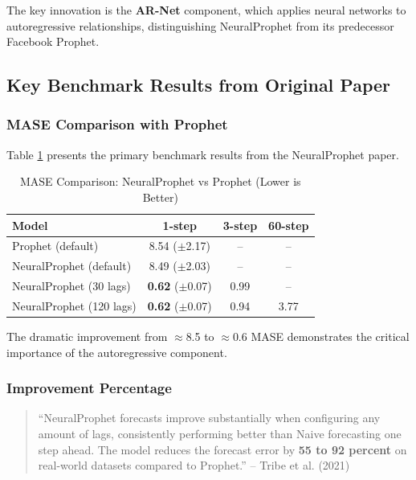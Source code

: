 \documentclass[12pt,a4paper]{article}
\begin{document}
The key innovation is the \textbf{AR-Net} component, which applies neural networks to autoregressive relationships, distinguishing NeuralProphet from its predecessor Facebook Prophet.

\subsection{Key Benchmark Results from Original Paper}

\subsubsection{MASE Comparison with Prophet}

Table \ref{tab:np_mase} presents the primary benchmark results from the NeuralProphet paper.

\begin{table}[htbp]
\centering
\caption{MASE Comparison: NeuralProphet vs Prophet (Lower is Better)}
\label{tab:np_mase}
\begin{tabular}{|l|c|c|c|}
\hline
\textbf{Model} & \textbf{1-step} & \textbf{3-step} & \textbf{60-step} \\
\hline
Prophet (default) & 8.54 ($\pm$2.17) & -- & -- \\
NeuralProphet (default) & 8.49 ($\pm$2.03) & -- & -- \\
NeuralProphet (30 lags) & \textbf{0.62} ($\pm$0.07) & 0.99 & -- \\
NeuralProphet (120 lags) & \textbf{0.62} ($\pm$0.07) & 0.94 & 3.77 \\
\hline
\end{tabular}
\end{table}

The dramatic improvement from $\approx$8.5 to $\approx$0.6 MASE demonstrates the critical importance of the autoregressive component.

\subsubsection{Improvement Percentage}

\begin{quote}
``NeuralProphet forecasts improve substantially when configuring any amount of lags, consistently performing better than Naive forecasting one step ahead. The model reduces the forecast error by \textbf{55 to 92 percent} on real-world datasets compared to Prophet.'' -- Tribe et al. (2021)
\end{quote}
\end{document}
